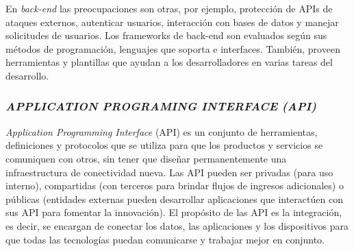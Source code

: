 
En \textit{back-end} las preocupaciones son otras, por ejemplo, protección de APIs de ataques externos, autenticar usuarios, interacción con bases de datos y manejar solicitudes de usuarios. Los frameworks de back-end son evaluados según sus métodos de programación, lenguajes que soporta e interfaces. También, proveen herramientas y plantillas que ayudan a los desarrolladores en varias tareas del desarrollo. \cite{webframedbws}

\subsubsection{\textit{APPLICATION PROGRAMING INTERFACE (API)}}

\textit{Application Programming Interface} (API) es un conjunto de herramientas, definiciones y protocolos que se utiliza para que los productos y servicios se comuniquen con otros, sin tener que diseñar permanentemente una infraestructura de conectividad nueva. Las API pueden ser privadas (para uso interno), compartidas (con terceros para brindar flujos de ingresos adicionales) o públicas (entidades externas pueden desarrollar aplicaciones que interactúen con sus API para fomentar la innovación).
El propósito de las API es la integración, es decir, se encargan de conectar los datos, las aplicaciones y los dispositivos para que todas las tecnologías puedan comunicarse y trabajar mejor en conjunto.


